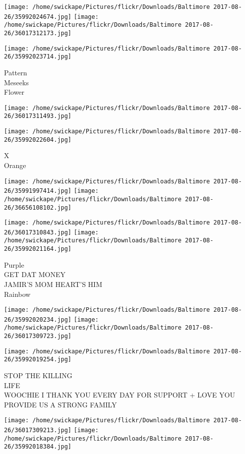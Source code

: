 \documentclass[10pt,letterpaper]{article}
\begin{document}
\texttt{[image: /home/swickape/Pictures/flickr/Downloads/Baltimore 2017-08-26/35992024674.jpg]}
\texttt{[image: /home/swickape/Pictures/flickr/Downloads/Baltimore 2017-08-26/36017312173.jpg]}

\vspace{0.25in}
\texttt{[image: /home/swickape/Pictures/flickr/Downloads/Baltimore 2017-08-26/35992023714.jpg]}

Pattern\\
Meseeks\\
Flower
\pagebreak

\texttt{[image: /home/swickape/Pictures/flickr/Downloads/Baltimore 2017-08-26/36017311493.jpg]}

\vspace{0.25in}
\texttt{[image: /home/swickape/Pictures/flickr/Downloads/Baltimore 2017-08-26/35992022604.jpg]}

X\\
Orange
\pagebreak

\texttt{[image: /home/swickape/Pictures/flickr/Downloads/Baltimore 2017-08-26/35991997414.jpg]}
\texttt{[image: /home/swickape/Pictures/flickr/Downloads/Baltimore 2017-08-26/36656108102.jpg]}

\texttt{[image: /home/swickape/Pictures/flickr/Downloads/Baltimore 2017-08-26/36017310843.jpg]}
\texttt{[image: /home/swickape/Pictures/flickr/Downloads/Baltimore 2017-08-26/35992021164.jpg]}

Purple\\
GET DAT MONEY\\
JAMIR'S MOM HEART'S HIM\\
Rainbow
\pagebreak

\texttt{[image: /home/swickape/Pictures/flickr/Downloads/Baltimore 2017-08-26/35992020234.jpg]}
\texttt{[image: /home/swickape/Pictures/flickr/Downloads/Baltimore 2017-08-26/36017309723.jpg]}

\vspace{0.25in}
\texttt{[image: /home/swickape/Pictures/flickr/Downloads/Baltimore 2017-08-26/35992019254.jpg]}

STOP THE KILLING\\
LIFE\\
WOOCHIE I THANK YOU EVERY DAY FOR SUPPORT + LOVE YOU PROVIDE US A STRONG FAMILY
\pagebreak

\texttt{[image: /home/swickape/Pictures/flickr/Downloads/Baltimore 2017-08-26/36017309213.jpg]}
\texttt{[image: /home/swickape/Pictures/flickr/Downloads/Baltimore 2017-08-26/35992018384.jpg]}
\end{document}

